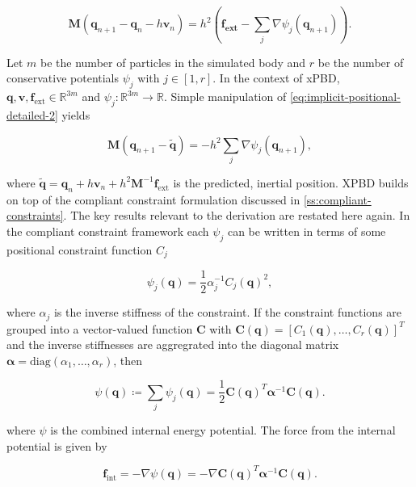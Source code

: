 \begin{equation}\label{eq:implicit-positional-detailed-2}
    \bm{M}(\bm{q}_{n+1} - \bm{q}_n - h\bm{v}_n) = h^2(\bm{f_\text{ext}} - \sum_j \nabla \psi_j(\bm{q}_{n+1})).
\end{equation}

\noindent Let $m$ be the number of particles in the simulated body and $r$ be the number of conservative potentials $\psi_j$ with $j \in [1, r]$.
In the context of xPBD, $\bm{q}, \bm{v}, \bm{f}_{\text{ext}} \in \mathbb{R}^{3m}$ and $\psi_j \colon \mathbb{R}^{3m} \to \mathbb{R}$. Simple 
manipulation of \cref{eq:implicit-positional-detailed-2} yields

\begin{equation}\label{eq:implicit-positional-detailed-3}
    \bm{M} \left( \bm{q}_{n+1} - \bm{\tilde{q}} \right) = - h^2 \sum_j \nabla \psi_j(\bm{q}_{n+1}),
\end{equation}

\noindent where $\bm{\tilde{q}} = \bm{q}_n + h\bm{v}_n + h^2 \bm{M}^{-1} \bm{f}_{\text{ext}}$ is the predicted, inertial position. XPBD builds on
top of the compliant constraint formulation discussed in \cref{ss:compliant-constraints}. The key results relevant to the derivation are restated
here again. In the compliant constraint framework each $\psi_j$ can be written in terms of some positional constraint function $C_j$ 

\begin{equation}\label{eq:xpbd-potential-j}
    \psi_j(\bm{q}) = \frac{1}{2} \alpha^{-1}_j C_j(\bm{q})^2,
\end{equation}

\noindent where $\alpha_j$ is the inverse stiffness of the constraint. If the constraint functions are grouped into a vector-valued function
$\bm{C}$ with $\bm{C}(\bm{q}) = [C_1(\bm{q}), \ldots, C_r(\bm{q})]^T$ and the inverse stiffnesses are aggregrated into the diagonal matrix
$\bm{\alpha} = \text{diag}(\alpha_1, \ldots, \alpha_r)$, then

\begin{equation}\label{eq:xpbd-potential}
    \psi(\bm{q}) \coloneq \sum_j \psi_j(\bm{q}) = \frac{1}{2}\bm{C}(\bm{q})^T \bm{\alpha}^{-1} \bm{C}(\bm{q}).
\end{equation}

\noindent where $\psi$ is the combined internal energy potential. The force from the internal potential is given by

\begin{equation}\label{eq:xpbd-internal-force}
    \bm{f}_{\text{int}} = -\nabla \psi(\bm{q}) = -\nabla \bm{C}(\bm{q})^T \bm{\alpha}^{-1} \bm{C}(\bm{q}).
\end{equation}

